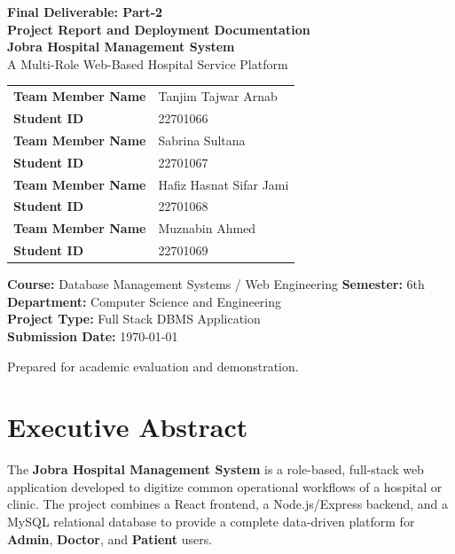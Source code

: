 \documentclass[12pt,a4paper]{article}
\newcommand{\infobox}[1]{
    \vspace{0.4em}
    \noindent\colorbox{SoftBlue}{\parbox{\dimexpr\linewidth-2\fboxsep\relax}{#1}}
    \vspace{0.4em}
}
\begin{document}
\begin{titlepage}
    \centering
    \vspace*{1.2cm}
    {\Huge\color{Primary}\textbf{Final Deliverable: Part-2}}\\[0.25cm]
    {\Large\color{Secondary}\textbf{Project Report and Deployment Documentation}}\\[1.4cm]
    
    {\Huge\textbf{\textcolor{Primary}{Jobra Hospital Management System}}}\\[0.6cm]
    {\large\textcolor{Secondary}{A Multi-Role Web-Based Hospital Service Platform}}\\[1.2cm]
    
    \begin{tabular}{>{\bfseries}p{5.5cm} p{6.5cm}}
        Team Member Name & Tanjim Tajwar Arnab \\
        Student ID & 22701066 \\
        Team Member Name & Sabrina Sultana \\
        Student ID & 22701067 \\
        Team Member Name & Hafiz Hasnat Sifar Jami \\
        Student ID & 22701068 \\
        Team Member Name & Muznabin Ahmed \\
        Student ID & 22701069 \\
    \end{tabular}
    
    \vfill
    
    \infobox{
    \textbf{Course:} Database Management Systems / Web Engineering \hfill
    \textbf{Semester:} 6th\\
    \textbf{Department:} Computer Science and Engineering\\
    \textbf{Project Type:} Full Stack DBMS Application\\
    \textbf{Submission Date:} \today
    }
    
    \vfill
    {\small\textcolor{Secondary}{Prepared for academic evaluation and demonstration.}}
\end{titlepage}

\tableofcontents
\newpage

\section*{Executive Abstract}
The \textbf{Jobra Hospital Management System} is a role-based, full-stack web application developed to digitize common operational workflows of a hospital or clinic. The project combines a React frontend, a Node.js/Express backend, and a MySQL relational database to provide a complete data-driven platform for \textbf{Admin}, \textbf{Doctor}, and \textbf{Patient} users.
\end{document}
